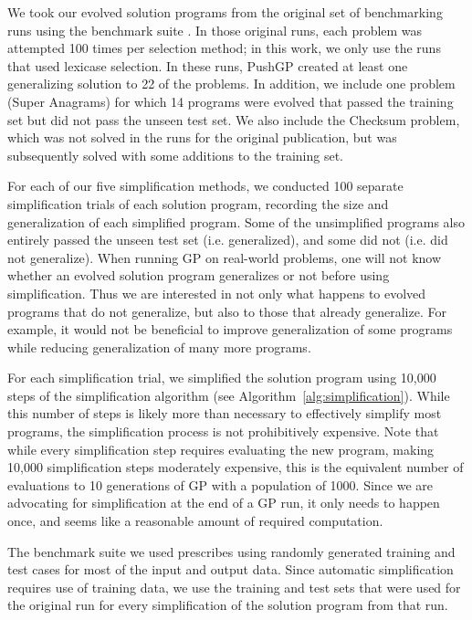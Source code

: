 We took our evolved solution programs from the original set of benchmarking runs using the benchmark suite \cite{Helmuth:2015:GECCO}. In those original runs, each problem was attempted 100 times per selection method; in this work, we only use the runs that used lexicase selection. In these runs, PushGP created at least one generalizing solution to 22 of the problems. In addition, we include one problem (Super Anagrams) for which 14 programs were evolved that passed the training set but did not pass the unseen test set. We also include the Checksum problem, which was not solved in the runs for the original publication, but was subsequently solved with some additions to the training set.

For each of our five simplification methods, we conducted 100 separate simplification trials of each solution program, recording the size and generalization of each simplified program. Some of the unsimplified programs also entirely passed the unseen test set (i.e. generalized), and some did not (i.e. did not generalize). When running GP on real-world problems, one will not know whether an evolved solution program generalizes or not before using simplification. Thus we are interested in not only what happens to evolved programs that do not generalize, but also to those that already generalize. For example, it would not be beneficial to improve generalization of some programs while reducing generalization of many more programs.

For each simplification trial, we simplified the solution program using 10,000 steps of the simplification algorithm (see Algorithm~\ref{alg:simplification}). While this number of steps is likely more than necessary to effectively simplify most programs, the simplification process is not prohibitively expensive. Note that while every simplification step requires evaluating the new program, making 10,000 simplification steps moderately expensive, this is the equivalent number of evaluations to 10 generations of GP with a population of 1000. Since we are advocating for simplification at the end of a GP run, it only needs to happen once, and seems like a reasonable amount of required computation.

The benchmark suite we used prescribes using randomly generated training and test cases for most of the input and output data. Since automatic simplification requires use of training data, we use the training and test sets that were used for the original run for every simplification of the solution program from that run.



